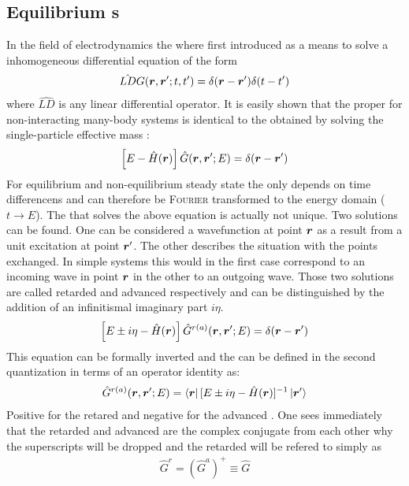 \subsection{Equilibrium \cgfnc s}
In the field of electrodynamics the \gfnc{} where first introduced as a means to solve a inhomogeneous differential equation of the form
\begin{align}
\hat{LD}G(\boldsymbol{r},\boldsymbol{r}';t,t') = \delta(\boldsymbol{r}-\boldsymbol{r}')\delta(t-t')
\label{eqn:lineardiff}
\end{align}
where $\hat{LD}$ is any linear differential operator. It  is easily shown that the proper \gfnc{} for non-interacting many-body systems is identical to the \gfnc{} obtained by solving the single-particle effective mass \sdg{} \cite{ferry1999transport}:
\begin{align}
\left[ E -\hat{H}(\boldsymbol{r})\right] \hat{G}(\boldsymbol{r},\boldsymbol{r}';E) = \delta (\boldsymbol{r}-\boldsymbol{r}')
\end{align}
For equilibrium \cite{fetter2003quantum} and non-equilibrium steady state \cite{haug2008quantum} the \gfnc{} only depends on time differencens and can therefore be \textsc{Fourier} transformed to the energy domain ($t \rightarrow E$). The \gfnc{} that solves the above equation is actually not unique. Two solutions can be found. One can be considered a wavefunction at point $\boldsymbol{r}$ as a result from a unit excitation at point $\boldsymbol{r}'$. The other describes the situation with the points exchanged. In simple systems this would in the first case correspond to an incoming wave in point $\boldsymbol{r}$ in the other to an outgoing wave.
Those two solutions are called retarded and advanced \gfnc{} respectively and can be distinguished by the addition of an infinitismal imaginary part $i\eta$.
\begin{align}
\left[ E \pm i \eta -\hat{H}(\boldsymbol{r})\right] \hat{G}^{r(a)}(\boldsymbol{r},\boldsymbol{r}';E) = \delta (\boldsymbol{r}-\boldsymbol{r}')
\end{align}
This equation can be formally inverted and the \gfnc{} can be defined in the second quantization in terms of an operator identity as:
\begin{align}
\hat{G}^{r(a)}(\boldsymbol{r},\boldsymbol{r}';E) = \left< \boldsymbol{r} \right| [E\pm i \eta - \hat{H}(\boldsymbol{r})]^{-1} \left| \boldsymbol{r}' \right>
\end{align}
Positive for the retared and negative for the advanced \gfnc{}. One sees immediately that the retarded and advanced \gfnc{} are the complex conjugate from each other why the superscripts will be dropped and the retarded \gfnc{} will be refered to simply as \gfnc{}
\begin{align}
\hat{G}^r = (\hat{G}^a)^+ \equiv \hat{G}
\end{align}
